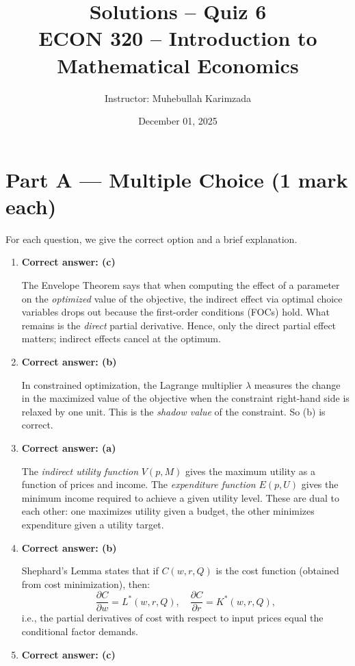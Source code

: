 \documentclass[12pt]{article}
\title{Solutions -- Quiz 6\\ \vspace{5pt}
\large ECON 320 -- Introduction to Mathematical Economics}
\author{Instructor: Muhebullah Karimzada}
\date{December 01, 2025}
\begin{document}
\maketitle

\section*{Part A — Multiple Choice (1 mark each)}

For each question, we give the correct option and a brief explanation.

\begin{enumerate}

\item \textbf{Correct answer: (c)}  

The Envelope Theorem says that when computing the effect of a parameter on the \emph{optimized} value of the objective, the indirect effect via optimal choice variables drops out because the first-order conditions (FOCs) hold. What remains is the \emph{direct} partial derivative. Hence, only the direct partial effect matters; indirect effects cancel at the optimum.

\item \textbf{Correct answer: (b)}  

In constrained optimization, the Lagrange multiplier $\lambda$ measures the change in the maximized value of the objective when the constraint right-hand side is relaxed by one unit. This is the \emph{shadow value} of the constraint. So (b) is correct.

\item \textbf{Correct answer: (a)}  

The \emph{indirect utility function} $V(p,M)$ gives the maximum utility as a function of prices and income. The \emph{expenditure function} $E(p,U)$ gives the minimum income required to achieve a given utility level. These are dual to each other: one maximizes utility given a budget, the other minimizes expenditure given a utility target.
\newpage

\item \textbf{Correct answer: (b)}  

Shephard's Lemma states that if $C(w,r,Q)$ is the cost function (obtained from cost minimization), then:
\[
\frac{\partial C}{\partial w} = L^*(w,r,Q), 
\quad
\frac{\partial C}{\partial r} = K^*(w,r,Q),
\]
i.e., the partial derivatives of cost with respect to input prices equal the conditional factor demands.

\item \textbf{Correct answer: (c)}  


\end{enumerate}
\end{document}
